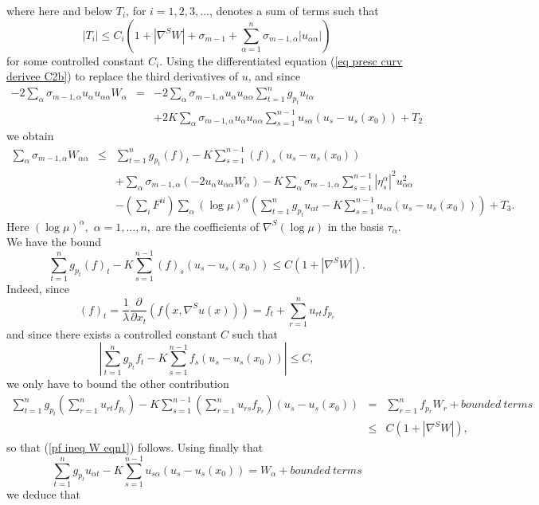 \documentclass[10pt,reqno,oneside]{amsart}
\theoremstyle{definition}
\theoremstyle{remark}
\begin{document}
where here and below $T_i$, for $i=1,2,3,\ldots$, denotes a sum of terms such that 
$$|T_i|\leq C_i\left(1+|\nabla^S W|+\sigma_{m-1}+\sum_{\alpha=1}^n\sigma_{m-1,\alpha}|u_{\alpha\alpha}|\right)$$
for some controlled constant $C_i$. Using the differentiated equation (\ref{eq presc curv derivee C2b}) to replace the third derivatives of $u$, and since
\begin{eqnarray*}
-2\sum_{\alpha}\sigma_{m-1,\alpha}u_{\alpha}u_{\alpha\alpha}W_{\alpha}&=&-2\sum_{\alpha}\sigma_{m-1,\alpha}u_{\alpha}u_{\alpha\alpha}\sum_{t=1}^ng_{p_t}u_{t\alpha}\\
&&+2K\sum_{\alpha}\sigma_{m-1,\alpha}u_{\alpha}u_{\alpha\alpha}\sum_{s=1}^{n-1}u_{s\alpha}(u_s-u_s(x_0))+T_2
\end{eqnarray*}
we obtain
\begin{eqnarray*}
\sum_{\alpha}\sigma_{m-1,\alpha}W_{\alpha\alpha}&\leq &\sum_{t=1}^ng_{p_t}(f)_t-K\sum_{s=1}^{n-1}(f)_s(u_s-u_s(x_0))\\
&&+\sum_{\alpha}\sigma_{m-1,\alpha}(-2u_{\alpha}u_{\alpha\alpha}W_{\alpha})-K\sum_{\alpha}\sigma_{m-1,\alpha}\sum_{s=1}^{n-1}|\eta_s^{\alpha}|^2u_{\alpha\alpha}^2\\
&&-(\sum_iF^{ii})\sum_{\alpha}(\log\mu)^{\alpha}\left(\sum_{t=1}^ng_{p_t}u_{\alpha t}-K\sum_{s=1}^{n-1}u_{s\alpha}(u_s-u_s(x_0))\right)+T_3.
\end{eqnarray*}
Here $(\log \mu)^{\alpha},$ $\alpha=1,\ldots,n,$ are the coefficients of $\nabla^S(\log\mu)$ in the basis $\tau_{\alpha}.$ We have the bound
\begin{equation}\label{pf ineq W eqn1}
\sum_{t=1}^ng_{p_t}(f)_t-K\sum_{s=1}^{n-1}(f)_s(u_s-u_s(x_0))\leq C(1+|\nabla^S W|).
\end{equation}
Indeed, since
$$(f)_t=\frac{1}{\lambda}\frac{\partial}{\partial x_t}(f(x,\nabla^S u(x)))=f_t+\sum_{r=1}^nu_{rt}f_{p_r}$$
and since there exists a controlled constant $C$ such that
$$\left|\sum_{t=1}^ng_{p_t}f_t-K\sum_{s=1}^{n-1}f_s(u_s-u_s(x_0))\right|\leq C,$$
we only have to bound the other contribution
\begin{eqnarray*}
\sum_{t=1}^ng_{p_t}\left(\sum_{r=1}^nu_{rt}f_{p_r}\right)-K\sum_{s=1}^{n-1}\left(\sum_{r=1}^nu_{rs}f_{p_r}\right)(u_s-u_s(x_0))&=&\sum_{r=1}^nf_{p_r}W_r+bounded\ terms\\
&\leq&C(1+|\nabla^S W|),
\end{eqnarray*}
so that (\ref{pf ineq W eqn1}) follows. Using finally that
$$\sum_{t=1}^ng_{p_t}u_{\alpha t}-K\sum_{s=1}^{n-1}u_{s\alpha}(u_s-u_s(x_0))=W_{\alpha}+bounded\ terms$$
we deduce that
\end{document}

